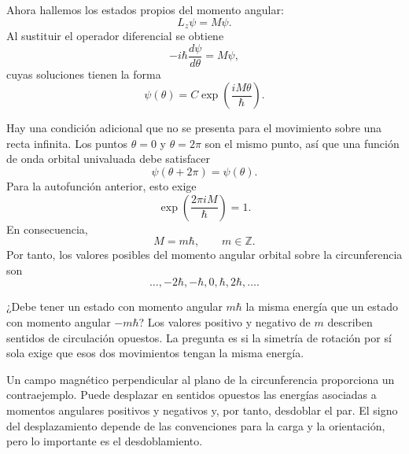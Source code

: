 Ahora hallemos los estados propios del momento angular:
\begin{equation}
L_z\psi=M\psi.
\end{equation}
Al sustituir el operador diferencial se obtiene
\begin{equation}
-i\hbar\frac{d\psi}{d\theta}=M\psi,
\end{equation}
cuyas soluciones tienen la forma
\begin{equation}
\psi(\theta)=C\exp\left(\frac{iM\theta}{\hbar}\right).
\end{equation}

Hay una condición adicional que no se presenta para el movimiento sobre una recta infinita. Los puntos \(\theta=0\) y \(\theta=2\pi\) son el mismo punto, así que una función de onda orbital univaluada debe satisfacer
\begin{equation}
\psi(\theta+2\pi)=\psi(\theta).
\end{equation}
Para la autofunción anterior, esto exige
\begin{equation}
\exp\left(\frac{2\pi iM}{\hbar}\right)=1.
\end{equation}
En consecuencia,
\begin{equation}
M=m\hbar,
\qquad
m\in\mathbb Z.
\end{equation}
Por tanto, los valores posibles del momento angular orbital sobre la circunferencia son
\begin{equation}
\ldots,-2\hbar,-\hbar,0,\hbar,2\hbar,\ldots.
\end{equation}

¿Debe tener un estado con momento angular \(m\hbar\) la misma energía que un estado con momento angular \(-m\hbar\)? Los valores positivo y negativo de \(m\) describen sentidos de circulación opuestos. La pregunta es si la simetría de rotación por sí sola exige que esos dos movimientos tengan la misma energía.

\begin{classroomqa}
\end{classroomqa}

Un campo magnético perpendicular al plano de la circunferencia proporciona un contraejemplo. Puede desplazar en sentidos opuestos las energías asociadas a momentos angulares positivos y negativos y, por tanto, desdoblar el par. El signo del desplazamiento depende de las convenciones para la carga y la orientación, pero lo importante es el desdoblamiento.

